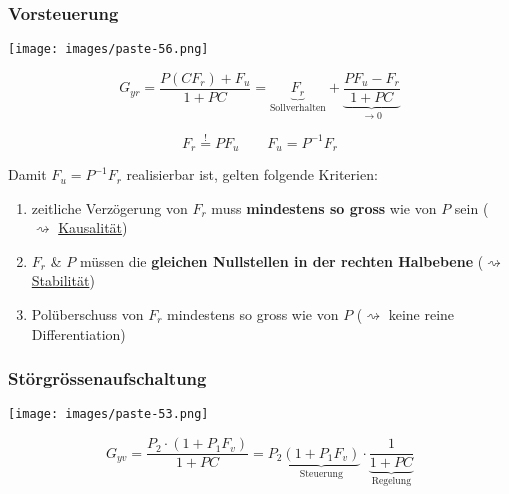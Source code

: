 \documentclass[
  10pt,
  a4paper,
  twocolumn]{article}
\providecommand{\tightlist}{%
  \setlength{\itemsep}{0pt}\setlength{\parskip}{0pt}}\usepackage{longtable,booktabs,array}
\numberwithin{equation}{section}
\begin{document}
\subsubsection{Vorsteuerung}\label{vorsteuerung-1}

\texttt{[image: images/paste-56.png]}

\[
G_{yr}=\frac{P(CF_r)+F_u}{1+PC}=\underbrace{F_r}_{\text{Sollverhalten}}+\underbrace{\frac{PF_u-F_r}{1+PC}}_{\rightarrow 0}
\]

\[
F_r \stackrel{!}{=}PF_u\qquad F_u = P^{-1}F_r
\]

\begin{tcolorbox}[enhanced jigsaw, coltitle=black, colback=white, breakable, colframe=quarto-callout-caution-color-frame, rightrule=.15mm, left=2mm, opacityback=0, leftrule=.75mm, toptitle=1mm, colbacktitle=quarto-callout-caution-color!10!white, bottomtitle=1mm, arc=.35mm, bottomrule=.15mm, title=\textcolor{quarto-callout-caution-color}{\faFire}\hspace{0.5em}{Anforderungen \(F_r\)}, titlerule=0mm, toprule=.15mm, opacitybacktitle=0.6]

Damit \(F_u = P^{-1}F_r\) realisierbar ist, gelten folgende Kriterien:

\begin{enumerate}
\def\labelenumi{\arabic{enumi}.}
\tightlist
\item
  zeitliche Verzögerung von \(F_r\) muss \textbf{mindestens so gross}
  wie von \(P\) sein ( \(\rightsquigarrow\) \ul{Kausalität})
\item
  \(F_r\) \& \(P\) müssen die \textbf{gleichen Nullstellen in der
  rechten Halbebene} (\(\rightsquigarrow\) \ul{Stabilität})
\item
  Polüberschuss von \(F_r\) mindestens so gross wie von \(P\)
  (\(\rightsquigarrow\) keine reine Differentiation)
\end{enumerate}

\end{tcolorbox}

\subsubsection{Störgrössenaufschaltung}\label{stuxf6rgruxf6ssenaufschaltung}

\texttt{[image: images/paste-53.png]}

\[
G_{yv} = \frac{P_2\cdot(1 + P_1F_v)}{1 + PC}= P_2\underbrace{(1 + P_1F_v)}_{\text{Steuerung}}\cdot\underbrace{\frac1{1+PC}}_{\text{Regelung}}
\]
\end{document}
